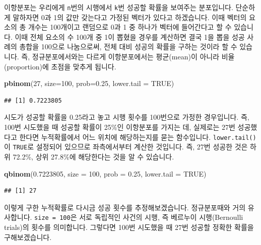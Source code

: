 \documentclass[]{book}
\newenvironment{Shaded}{\begin{snugshade}}{\end{snugshade}}
\newcommand{\DataTypeTok}[1]{\textcolor[rgb]{0.13,0.29,0.53}{#1}}
\newcommand{\DecValTok}[1]{\textcolor[rgb]{0.00,0.00,0.81}{#1}}
\newcommand{\FloatTok}[1]{\textcolor[rgb]{0.00,0.00,0.81}{#1}}
\newcommand{\KeywordTok}[1]{\textcolor[rgb]{0.13,0.29,0.53}{\textbf{#1}}}
\newcommand{\NormalTok}[1]{#1}
\newcommand{\OtherTok}[1]{\textcolor[rgb]{0.56,0.35,0.01}{#1}}
\begin{document}
이항분포는 우리에게 \texttt{n}번의 시행에서 \texttt{k}번 성공할 확률을 보여주는 분포입니다. 단순하게 말하자면 0과 1의 값만 갖는다고 가정된 벡터가 있다고 하겠습니다. 이때 벡터의 요소의 총 개수는 100개이고 랜덤으로 0과 1 중 하나가 벡터에 들어간다고 할 수 있습니다. 이때 전체 요소의 수 100개 중 1이 뽑혔을 경우를 계산하면 결국 1을 뽑을 성공 사례의 총합을 100으로 나눔으로써, 전체 대비 성공의 확률을 구하는 것이라 할 수 있습니다. 즉, 정규분포에서와는 다르게 이항분포에서는 평균(mean)이 아니라 비율(proportion)에 초점을 맞추게 됩니다.

\begin{Shaded}
\begin{Highlighting}[]
\KeywordTok{pbinom}\NormalTok{(}\DecValTok{27}\NormalTok{, }\DataTypeTok{size=}\DecValTok{100}\NormalTok{, }\DataTypeTok{prob=}\FloatTok{0.25}\NormalTok{, }\DataTypeTok{lower.tail =} \OtherTok{TRUE}\NormalTok{)}
\end{Highlighting}
\end{Shaded}

\begin{verbatim}
## [1] 0.7223805
\end{verbatim}

시도가 성공할 확률을 0.25라고 놓고 시행 횟수를 100번으로 가정한 경우입니다. 즉, 100번 시도했을 때 성공할 확률이 25\%인 이항분포를 가지는 데, 실제로는 27번 성공했다고 한다면 누적확률에서 어느 위치에 해당하는지를 묻는 함수입니다. \texttt{lower.tail()}이 \texttt{TRUE}로 설정되어 있으므로 좌측에서부터 계산한 것입니다. 즉, 27번 성공한 것은 하위 72.2\%, 상위 27.8\%에 해당한다는 것을 알 수 있습니다.

\begin{Shaded}
\begin{Highlighting}[]
\KeywordTok{qbinom}\NormalTok{(}\FloatTok{0.7223805}\NormalTok{, }\DataTypeTok{size =} \DecValTok{100}\NormalTok{, }\DataTypeTok{prob =} \FloatTok{0.25}\NormalTok{, }\DataTypeTok{lower.tail =} \OtherTok{TRUE}\NormalTok{)}
\end{Highlighting}
\end{Shaded}

\begin{verbatim}
## [1] 27
\end{verbatim}

이렇게 구한 누적확률로 다시금 성공 횟수를 추정해보겠습니다. 정규분포때와 거의 유사합니다. \texttt{size\ =\ 100}은 서로 독립적인 사건의 시행, 즉 베르누이 시행(Bernoulli trials)의 횟수를 의미합니다. 그렇다면 100번 시도했을 때 27번 성공할 정확한 확률을 구해보겠습니다.
\end{document}
